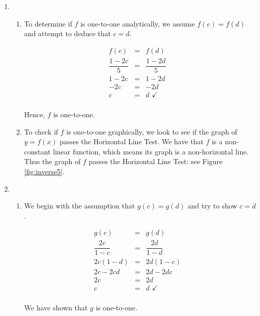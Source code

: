 {
\begin{enumerate}

\item  \begin{enumerate} \item To determine if $f$ is one-to-one analytically, we assume $f(c) = f(d)$ and attempt to deduce that $c=d$. 

\[ \begin{array}{rclr}

f(c) & = & f(d) & \\ [3pt]
\dfrac{1-2c}{5} & = & \dfrac{1-2d}{5} & \\ [5pt]
1-2c & = & 1-2d & \\
-2c & = & -2d & \\
c & = & d \, \, \checkmark & \\

\end{array} \]

Hence, $f$ is one-to-one.

\item  To check if $f$ is one-to-one graphically, we look to see if the graph of $y=f(x)$ passes the Horizontal Line Test.  We have that $f$ is a non-constant linear function, which means its graph is a non-horizontal line.  Thus the  graph of $f$ passes the Horizontal Line Test: see Figure \ref{fig:inverse5}.


\end{enumerate}

\item \begin{enumerate} \item We begin with the assumption that $g(c) = g(d)$ and try to show $c=d$.

\[ \begin{array}{rclr}
g(c) & = & g(d) & \\ [3pt]
\dfrac{2c}{1-c} & = & \dfrac{2d}{1-d} & \\ [6pt]
2c(1-d) & = & 2d(1-c) & \\
2c - 2cd & = & 2d - 2dc & \\
2c & = & 2d & \\
c & = & d \, \, \checkmark \\ 
\end{array} \]

We have shown that $g$ is one-to-one.  


\end{enumerate}
\end{enumerate}}
